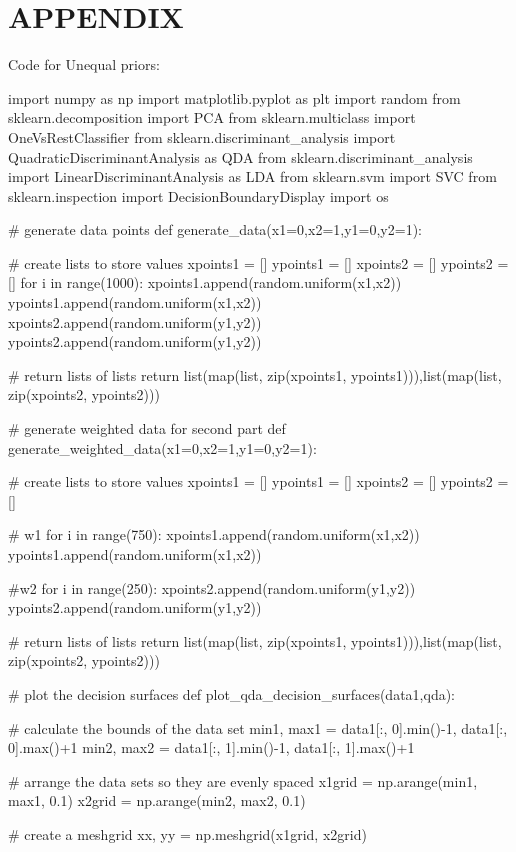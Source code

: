 \documentclass{article}
\begin{document}
\section{\MakeUppercase{Appendix}}
Code for Unequal priors:
{
\begin{python}
import numpy as np
import matplotlib.pyplot as plt
import random
from sklearn.decomposition import PCA
from sklearn.multiclass import OneVsRestClassifier
from sklearn.discriminant_analysis import QuadraticDiscriminantAnalysis as QDA
from sklearn.discriminant_analysis import LinearDiscriminantAnalysis as LDA
from sklearn.svm import SVC
from sklearn.inspection import DecisionBoundaryDisplay
import os

# generate data points
def generate_data(x1=0,x2=1,y1=0,y2=1):

	# create lists to store values
	xpoints1 = []
	ypoints1 = []
	xpoints2 = []
	ypoints2 = []
	for i in range(1000):
		xpoints1.append(random.uniform(x1,x2))
		ypoints1.append(random.uniform(x1,x2))
		xpoints2.append(random.uniform(y1,y2))
		ypoints2.append(random.uniform(y1,y2))
	
	# return lists of lists
	return list(map(list, zip(xpoints1, ypoints1))),list(map(list, zip(xpoints2, ypoints2)))

# generate weighted data for second part
def generate_weighted_data(x1=0,x2=1,y1=0,y2=1):

	# create lists to store values
	xpoints1 = []
	ypoints1 = []
	xpoints2 = []
	ypoints2 = []

	# w1        
	for i in range(750):
		xpoints1.append(random.uniform(x1,x2))
		ypoints1.append(random.uniform(x1,x2))

	#w2
	for i in range(250):
		xpoints2.append(random.uniform(y1,y2))
		ypoints2.append(random.uniform(y1,y2))
	
	# return lists of lists
	return list(map(list, zip(xpoints1, ypoints1))),list(map(list, zip(xpoints2, ypoints2)))

# plot the decision surfaces
def plot_qda_decision_surfaces(data1,qda):

	# calculate the bounds of the data set
	min1, max1 = data1[:, 0].min()-1, data1[:,  0].max()+1
	min2, max2 = data1[:, 1].min()-1, data1[:, 1].max()+1

	# arrange the data sets so they are evenly spaced
	x1grid = np.arange(min1, max1, 0.1)
	x2grid = np.arange(min2, max2, 0.1)

	# create a meshgrid
	xx, yy = np.meshgrid(x1grid, x2grid)


\end{python}}
\end{document}
